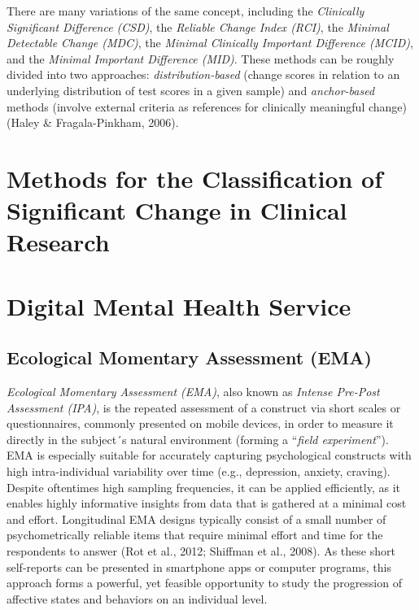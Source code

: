 \documentclass[12pt,twoside]{reedthesis}
\begin{document}
\par

There are many variations of the same concept, including the \emph{Clinically Significant Difference (CSD)}, the \emph{Reliable Change Index (RCI)}, the \emph{Minimal Detectable Change (MDC)}, the \emph{Minimal Clinically Important Difference (MCID)}, and the \emph{Minimal Important Difference (MID)}. These methods can be roughly divided into two approaches: \emph{distribution-based} (change scores in relation to an underlying distribution of test scores in a given sample) and \emph{anchor-based} methods (involve external criteria as references for clinically meaningful change) (Haley \& Fragala-Pinkham, 2006).

\hypertarget{methods-for-the-classification-of-significant-change-in-clinical-research}{%
\section{Methods for the Classification of Significant Change in Clinical Research}\label{methods-for-the-classification-of-significant-change-in-clinical-research}}

\hypertarget{digital-mental-health-service}{%
\section{Digital Mental Health Service}\label{digital-mental-health-service}}

\hypertarget{ecological-momentary-assessment-ema}{%
\subsection{Ecological Momentary Assessment (EMA)}\label{ecological-momentary-assessment-ema}}

\emph{Ecological Momentary Assessment (EMA)}, also known as \emph{Intense Pre-Post Assessment (IPA)}, is the repeated assessment of a construct via short scales or questionnaires, commonly presented on mobile devices, in order to measure it directly in the subject´s natural environment (forming a \enquote{\textit{field experiment}}). EMA is especially suitable for accurately capturing psychological constructs with high intra-individual variability over time (e.g., depression, anxiety, craving). Despite oftentimes high sampling frequencies, it can be applied efficiently, as it enables highly informative insights from data that is gathered at a minimal cost and effort. Longitudinal EMA designs typically consist of a small number of psychometrically reliable items that require minimal effort and time for the respondents to answer (Rot et al., 2012; Shiffman et al., 2008). As these short self-reports can be presented in smartphone apps or computer programs, this approach forms a powerful, yet feasible opportunity to study the progression of affective states and behaviors on an individual level.
\end{document}
